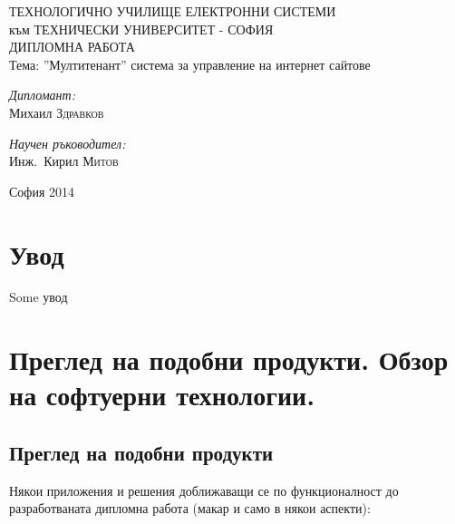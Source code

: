 \documentclass[pdftex,14pt,a4paper]{extreport}
\begin{document}
\setcounter{secnumdepth}{3}
\setcounter{tocdepth}{3}
\begin{titlepage}
	\begin{center}
		{\Huge ТЕХНОЛОГИЧНО УЧИЛИЩЕ ЕЛЕКТРОННИ СИСТЕМИ\\[0.5cm]} {\Large към ТЕХНИЧЕСКИ УНИВЕРСИТЕТ - СОФИЯ\\[3cm]}
		{\Huge ДИПЛОМНА РАБОТА\\[3cm]}
		Тема: ''Мултитенант'' система за управление на интернет сайтове\\[3cm]
		\begin{minipage}{0.4\textwidth}
			\begin{flushleft} \large
				\emph{Дипломант:}\\
				Михаил \textsc{Здравков}
			\end{flushleft}
		\end{minipage}
		\begin{minipage}{0.4\textwidth}
			\begin{flushright} \large
				\emph{Научен ръководител:} \\
				Инж.~Кирил \textsc{Митов}
			\end{flushright}
		\end{minipage}

		\vfill

		{\large София 2014}

	\end{center}
\end{titlepage}
\tableofcontents
\listoftables
\listoffigures
\pagebreak
{}
\chapter*{Увод}
Some увод
\chapter {Преглед на подобни продукти. Обзор на софтуерни технологии.}
\section {Преглед на подобни продукти}
Някои приложения и решения доближаващи се по функционалност до разработваната дипломна работа (макар и само в някои аспекти):
\end{document}

